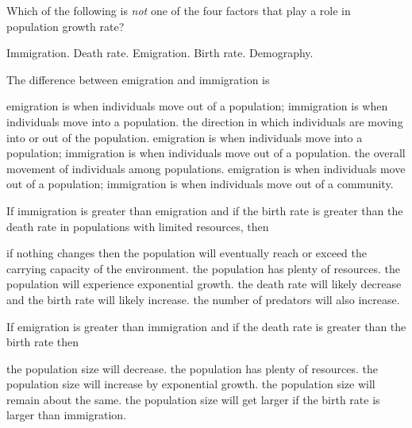 
\question
Which of the following is \textit{not} one of the four factors that play a role in population growth rate?

\begin{choices}
\choice Immigration.%
\choice Death rate.%
\choice Emigration.%
\choice Birth rate.%
\correctchoice Demography.%
\end{choices}



\question
The difference between emigration and immigration is

\begin{choices}
\correctchoice emigration is when individuals move out of a population; immigration is when individuals move into a population.%
\choice the direction in which individuals are moving into or out of the population.%
\choice emigration is when individuals move into a population; immigration is when individuals move out of a population.%
\choice the overall movement of individuals among populations.%
\choice emigration is when individuals move out of a population; immigration is when individuals move out of a community.%
\end{choices}

\question
If immigration is greater than emigration and if the birth rate is greater than the death rate in populations with limited resources, then

\begin{choices}
\correctchoice if nothing changes then the population will eventually reach or exceed the carrying capacity of the environment.%
\choice the population has plenty of resources.%
\choice the population will experience exponential growth.%
\choice the death rate will likely decrease and the birth rate will likely increase.%
\choice the number of predators will also increase.%
\end{choices}

\question
If emigration is greater than immigration and if the death rate is greater than the birth rate then

\begin{choices}
\correctchoice the population size will decrease.%
\choice the population has plenty of resources.%
\choice the population size will increase by exponential growth.%
\choice the population size will remain about the same.%
\choice the population size will get larger if the birth rate is larger than immigration.%
\end{choices}



